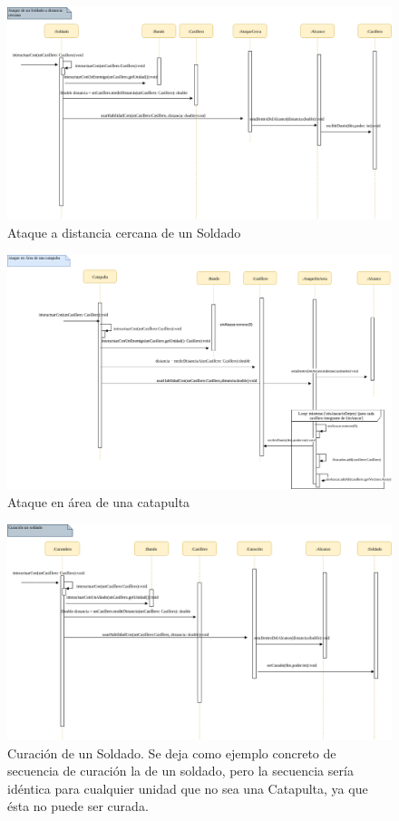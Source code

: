 \documentclass[titlepage,a4paper]{article}
\begin{document}
\begin{figure}[H]
\centering
\includegraphics[width=\textwidth]{AtaqueSoldado.png}
\caption{\label{fig:seq02}Ataque a distancia cercana de un Soldado}
\end{figure}


\begin{figure}[H]
\centering
\includegraphics[width=\textwidth]{AtaqueCatapulta.png}
\caption{\label{fig:seq02}Ataque en área de una catapulta}
\end{figure}

\begin{figure}[H]
\centering
\includegraphics[width=\textwidth]{Curacion (1).png}
\caption{\label{fig:seq02}Curación de un Soldado. Se deja como ejemplo concreto de secuencia de curación la de un soldado, pero la secuencia sería idéntica para cualquier unidad que no sea una Catapulta, ya que ésta no puede ser curada.}
\end{figure}
\end{document}
